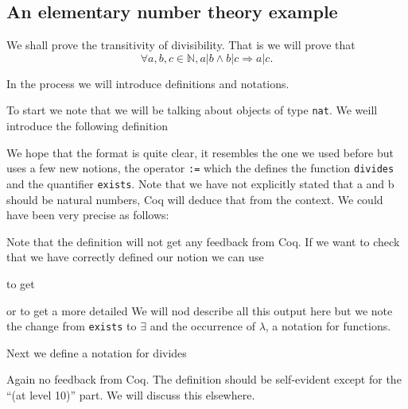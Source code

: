 \subsection{An elementary number theory example}
We shall prove the transitivity of divisibility. That is we will prove that
$$\forall a,b, c \in \mathbb{N},  a |b \land b | c \Rightarrow a | c.$$

In the process we will introduce definitions and notations.

To start we note that we will be talking about objects of type \texttt{nat}. We weill introduce the following definition


We hope that the format is quite clear, it resembles the one we used before but uses a few new notions, the operator \texttt{:=}
 which the defines the function \texttt{divides} and the quantifier \texttt{exists}. Note that we have not explicitly stated that a and b should be natural numbers, Coq will deduce that from the context. We could have been very precise as follows:

Note that the definition will not get any feedback from Coq. If we want to check that we have correctly defined our notion we can use

to get

     
or
to get a more detailed 
We will nod describe all this output here but we note the change from \texttt{exists} to $\exists$ and the occurrence of $\lambda$, a notation for functions.


Next we define a notation for divides


Again no feedback from Coq. The definition should be self-evident except for the ``(at level 10)'' part. We will discuss this elsewhere.

